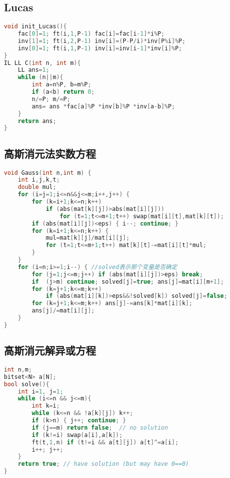 \documentclass[landscape,a4paper]{article}
\begin{document}
\subsection{Lucas}
\begin{lstlisting}[language=C++]
void init_Lucas(){
	fac[0]=1; ft(i,1,P-1) fac[i]=fac[i-1]*i%P;
	inv[1]=1; ft(i,2,P-1) inv[i]=(P-P/i)*inv[P%i]%P;
	inv[0]=1; ft(i,1,P-1) inv[i]=inv[i-1]*inv[i]%P;
}
IL LL C(int n, int m){
	LL ans=1;
	while (n||m){
		int a=n%P, b=m%P;
		if (a<b) return 0;
		n/=P; m/=P;
		ans= ans *fac[a]%P *inv[b]%P *inv[a-b]%P;
	}
	return ans;
}
\end{lstlisting}

\subsection{高斯消元法实数方程}
\begin{lstlisting}[language=C++]
void Gauss(int n,int m) {
	int i,j,k,t;
	double mul;
	for (i=j=1;i<=n&&j<=m;i++,j++) {
		for (k=i+1;k<=n;k++)
			if (abs(mat[k][j])>abs(mat[i][j]))
				for (t=1;t<=m+1;t++) swap(mat[i][t],mat[k][t]);
		if (abs(mat[i][j])<eps) { i--; continue; }
		for (k=i+1;k<=n;k++) {
			mul=mat[k][j]/mat[i][j];
			for (t=1;t<=m+1;t++) mat[k][t]-=mat[i][t]*mul;
		}
	}
	for (i=n;i>=1;i--) { //solved表示那个变量是否确定
		for (j=1;j<=m;j++) if (abs(mat[i][j])>eps) break;
		if  (j>m) continue; solved[j]=true; ans[j]=mat[i][m+1];
		for (k=j+1;k<=m;k++)
			if (abs(mat[i][k])>eps&&!solved[k]) solved[j]=false;
		for (k=j+1;k<=m;k++) ans[j]-=ans[k]*mat[i][k];
		ans[j]/=mat[i][j];
	}
}
\end{lstlisting}

\subsection{高斯消元解异或方程}
\begin{lstlisting}[language=C++]
int n,m;
bitset<N> a[N];
bool solve(){
	int i=1, j=1;	
	while (i<=n && j<=m){
		int k=i;
		while (k<=n && !a[k][j]) k++;
		if (k>n) { j++; continue; }
		if (j==m) return false;  // no solution
		if (k!=i) swap(a[i],a[k]);
		ft(t,1,n) if (t!=i && a[t][j]) a[t]^=a[i];
		i++; j++;
	}
	return true; // have solution (but may have 0==0)
}
\end{lstlisting}
\end{document}
